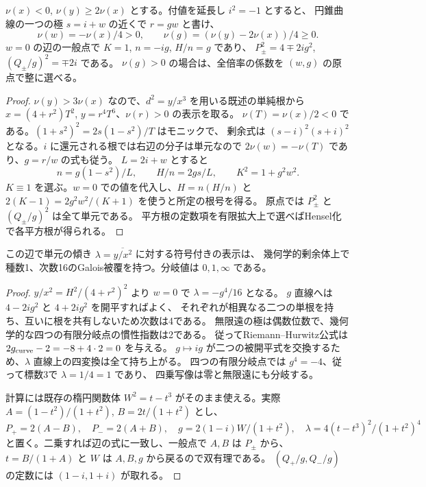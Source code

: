 \begin{lemma}\label{lem:rank-fifteen-negative-x-coordinates}
$\nu(x)<0$, $\nu(y)\ge2\nu(x)$ とする。付値を延長し $i^2=-1$ とすると、
円錐曲線の一つの極 $s=i+w$ の近くで $r=gw$ と書け、
\[
    \nu(w)=-\nu(x)/4>0,\qquad \nu(g)=(\nu(y)-2\nu(x))/4\ge0 .
\]
$w=0$ の辺の一般点で $K=1$, $n=-ig$, $H/n=g$ であり、
$P_\pm^2=4\mp2ig^2$, $(Q_\pm/g)^2=\mp2i$ である。
$\nu(g)>0$ の場合は、全倍率の係数を $(w,g)$ の原点で整に選べる。
\end{lemma}
\begin{proof}
$\nu(y)>3\nu(x)$ なので、$d^2=y/x^3$ を用いる既述の単純根から
$x=(4+r^2)T^2$, $y=r^4T^6$、$\nu(r)>0$ の表示を取る。
$\nu(T)=\nu(x)/2<0$ である。$(1+s^2)^2=2s(1-s^2)/T$ はモニックで、
剰余式は $(s-i)^2(s+i)^2$ となる。$i$ に還元される根では右辺の分子は単元なので
$2\nu(w)=-\nu(T)$ であり、$g=r/w$ の式も従う。
$L=2i+w$ とすると
\[
   n=g(1-s^2)/L,\qquad H/n=2gs/L,\qquad K^2=1+g^2 w^2 .
\]
$K\equiv1$ を選ぶ。$w=0$ での値を代入し、$H=n(H/n)$ と
$2(K-1)=2g^2w^2/(K+1)$ を使うと所定の根号を得る。
原点では $P_\pm^2$ と $(Q_\pm/g)^2$ は全て単元である。
平方根の定数項を有限拡大上で選べばHensel化で各平方根が得られる。
\end{proof}

\begin{corollary}
この辺で単元の傾き $\lambda=\overline{y/x^2}$ に対する符号付きの表示は、
幾何学的剰余体上で種数1、次数16のGalois被覆を持つ。分岐値は $0,1,\infty$ である。
\end{corollary}
\begin{proof}
$y/x^2=H^2/(4+r^2)^2$ より $w=0$ で $\lambda=-g^4/16$ となる。
$g$ 直線へは $4-2ig^2$ と $4+2ig^2$ を開平すればよく、
それぞれが相異なる二つの単根を持ち、互いに根を共有しないため次数は4である。
無限遠の極は偶数位数で、幾何学的な四つの有限分岐点の慣性指数は2である。
従ってRiemann--Hurwitz公式は $2g_{\rm curve}-2=-8+4\cdot2=0$ を与える。
$g\mapsto ig$ が二つの被開平式を交換するため、$\lambda$ 直線上の四変換は全て持ち上がる。
四つの有限分岐点では $g^4=-4$、従って標数3で $\lambda=1/4=1$ であり、
四乗写像は零と無限遠にも分岐する。

計算には既存の楕円関数体 $W^2=t-t^3$ がそのまま使える。実際
$A=(1-t^2)/(1+t^2)$, $B=2t/(1+t^2)$ とし、
\[
 P_+=2(A-B),\quad P_-=2(A+B),\quad
 g=2(1-i)W/(1+t^2),\quad \lambda=4(t-t^3)^2/(1+t^2)^4
\]
と置く。二乗すれば辺の式に一致し、一般点で $A,B$ は $P_\pm$ から、
$t=B/(1+A)$ と $W$ は $A,B,g$ から戻るので双有理である。
$(Q_+/g,Q_-/g)$ の定数には $(1-i,1+i)$ が取れる。
\end{proof}

